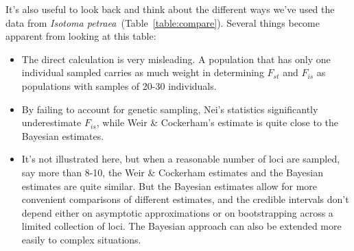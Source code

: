 \documentclass[12pt]{article}
\begin{document}
It's also useful to look back and think about the different ways
we've used the data from {\it Isotoma
  petraea}~(Table~\ref{table:compare}). Several things become apparent
from looking at this table:

\begin{itemize}

\item The direct calculation is very misleading. A population that
  has only one individual sampled carries as much weight in
  determining $F_{st}$ and $F_{is}$ as populations with samples of
  20-30 individuals.

\item By failing to account for genetic sampling, Nei's statistics
  significantly underestimate $F_{is}$, while Weir \& Cockerham's
  estimate is quite close to the Bayesian estimates.

\item It's not illustrated here, but when a reasonable number of loci
  are sampled, say more than 8-10, the Weir \& Cockerham estimates and
  the Bayesian estimates are quite similar. But the Bayesian estimates
  allow for more convenient comparisons of different estimates, and
  the credible intervals don't depend either on asymptotic
  approximations or on bootstrapping across a limited collection of
  loci. The Bayesian approach can also be extended more easily to
  complex situations.

\end{itemize}




\ccLicense
\end{document}
